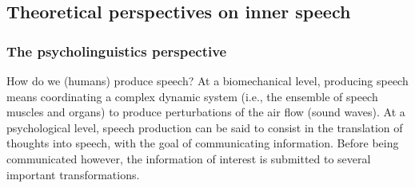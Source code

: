 \documentclass[a4paper,12pt,twoside,onecolumn,openright,final,oldfontcommands]{memoir}
\begin{document}
\hypertarget{inner-speech-theories}{%
\subsection{Theoretical perspectives on inner speech}\label{inner-speech-theories}}

\hypertarget{the-psycholinguistics-perspective}{%
\subsubsection{The psycholinguistics perspective}\label{the-psycholinguistics-perspective}}

How do we (humans) produce speech? At a biomechanical level, producing speech means coordinating a complex dynamic system (i.e., the ensemble of speech muscles and organs) to produce perturbations of the air flow (sound waves). At a psychological level, speech production can be said to consist in the translation of thoughts into speech, with the goal of communicating information. Before being communicated however, the information of interest is submitted to several important transformations.
\end{document}
